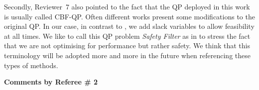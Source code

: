 \documentclass[10pt]{article}
\begin{document}
\begin{enumerate}[label={[E:\,\arabic{enumi}]}]
Secondly, Reviewer~7 also pointed to the fact that the QP deployed in this work is usually called CBF-QP. Often different works present some modifications to the original QP. In our case, in contrast to \cite{ames2019control}, we add slack variables to allow feasibility at all times. We like to call this QP problem \emph{Safety Filter} as in \cite{wabersich2021predictive} to stress the fact that we are not optimising for performance but rather safety. We think that this terminology will be adopted more and more in the future when referencing these types of methods.

\end{enumerate}




\clearpage
\bigskip
\hspace*{-25pt} \textbf{\large Comments by Referee \# 2}
\end{document}
